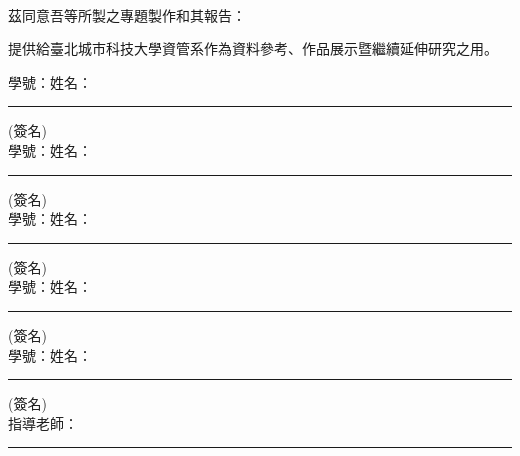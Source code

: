 \thispagestyle{EmptyWaterMarkPage}  %
%
\begin{center}
\fontsize{20}{14}\selectfont
%
\\  %
\vspace{1.5cm}
\raggedright
茲同意吾等所製之專題製作和其報告： \\[0.8cm]

\centerline{\uline{\cTitle}}


\raggedright
提供給臺北城市科技大學資管系作為資料參考、作品展示暨繼續延伸研究之用。

\centering 

\vspace{1.5cm}
%
\renewcommand{\baselinestretch}{1}   %

學號：\idA 姓名：\rule{0.3\textwidth}{1pt} (簽名) \\[0.7cm]
學號：\idB 姓名：\rule{0.3\textwidth}{1pt} (簽名) \\[0.7cm]
學號：\idC 姓名：\rule{0.3\textwidth}{1pt} (簽名) \\[0.7cm]
學號：\idD 姓名：\rule{0.3\textwidth}{1pt} (簽名) \\[0.7cm]
學號：\idE 姓名：\rule{0.3\textwidth}{1pt} (簽名) \\[0.7cm]

\vspace{2cm}
指導老師：\rule{0.4\textwidth}{1pt} \\[0.3cm]


\vfill
{}%
%
\end{center}
\clearpage
\normalsize


